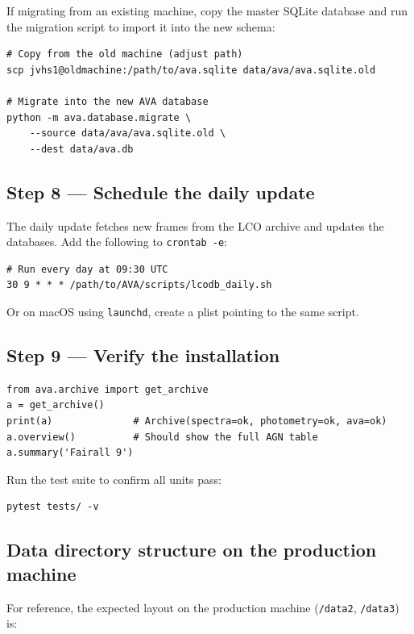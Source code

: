 \documentclass[12pt,a4paper]{article}
\begin{document}
If migrating from an existing machine, copy the master SQLite database and
run the migration script to import it into the new schema:

\begin{lstlisting}[style=shell]
# Copy from the old machine (adjust path)
scp jvhs1@oldmachine:/path/to/ava.sqlite data/ava/ava.sqlite.old

# Migrate into the new AVA database
python -m ava.database.migrate \
    --source data/ava/ava.sqlite.old \
    --dest data/ava.db
\end{lstlisting}

\subsection{Step 8 --- Schedule the daily update}

The daily update fetches new frames from the LCO archive and updates the
databases.  Add the following to \texttt{crontab -e}:

\begin{lstlisting}[style=shell]
# Run every day at 09:30 UTC
30 9 * * * /path/to/AVA/scripts/lcodb_daily.sh
\end{lstlisting}

Or on macOS using \texttt{launchd}, create a plist pointing to the same script.

\subsection{Step 9 --- Verify the installation}

\begin{lstlisting}[style=python]
from ava.archive import get_archive
a = get_archive()
print(a)              # Archive(spectra=ok, photometry=ok, ava=ok)
a.overview()          # Should show the full AGN table
a.summary('Fairall 9')
\end{lstlisting}

Run the test suite to confirm all units pass:
\begin{lstlisting}[style=shell]
pytest tests/ -v
\end{lstlisting}

\subsection{Data directory structure on the production machine}

For reference, the expected layout on the production machine
(\texttt{/data2}, \texttt{/data3}) is:
\end{document}
